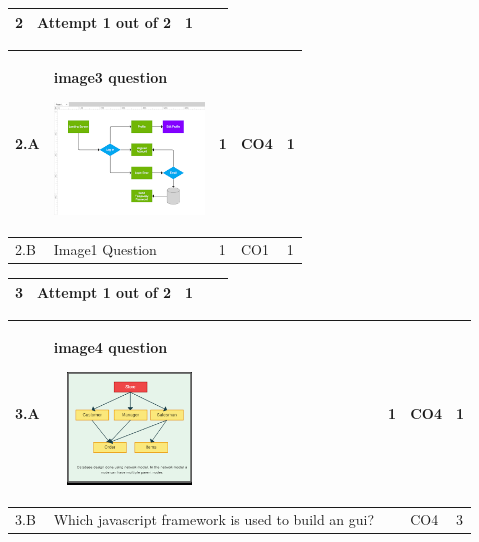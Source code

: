 \documentclass[12pt]{article}
\begin{document}
	\begin{tabular}{L{1cm}L{9cm}C{2cm}C{2cm}C{1cm}}
	\bf2 & Attempt 1 out of 2 & 1  & & \\ \hline
\end{tabular}



\begin{tabular}{|L{1cm}|L{9cm}|C{2cm}|C{2cm}|C{1cm}|}
		2.A &
	image3 question \newline
			\begin{center}
		\includegraphics[width=4cm,height=3cm]{media/diagrams/image3.png}	
	\end{center}
		
	 &  1 & CO4 & 1\\ \hline
		2.B &
	Image1 Question \newline
			
	 &  1 & CO1 & 1\\ \hline
	\end{tabular}


\begin{tabular}{L{1cm}L{9cm}C{2cm}C{2cm}C{1cm}}
	\bf3 & Attempt 1 out of 2 & 1  & & \\ \hline
\end{tabular}



\begin{tabular}{|L{1cm}|L{9cm}|C{2cm}|C{2cm}|C{1cm}|}
		3.A &
	image4 question \newline
			\begin{center}
		\includegraphics[width=4cm,height=3cm]{media/diagrams/image4.png}	
	\end{center}
		
	 &  1 & CO4 & 1\\ \hline
		3.B &
	Which javascript framework is used to build an gui? \newline
			
	 &   & CO4 & 3\\ \hline
	\end{tabular}
\end{document}
